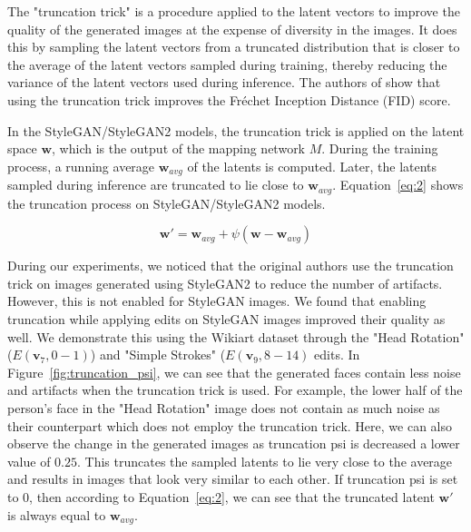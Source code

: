 The "truncation trick" is a procedure applied to the latent vectors to improve the quality of the generated images at the expense of diversity in the images. It does this by sampling the latent vectors from a truncated distribution that is closer to the average of the latent vectors sampled during training, thereby reducing the variance of the latent vectors used during inference. The authors of \cite{biggan} show that using the truncation trick improves the Fréchet Inception Distance (FID) score.

In the StyleGAN/StyleGAN2 models, the truncation trick is applied on the latent space $\textbf{w}$, which is the output of the mapping network $M$. During the training process, a running average $\textbf{w}_{avg}$ of the latents is computed. Later, the latents sampled during inference are truncated to lie close to $\textbf{w}_{avg}$. Equation~\ref{eq:2} shows the truncation process on StyleGAN/StyleGAN2 models.

\begin{equation}
    \textbf{w}' = \textbf{w}_{avg} + \psi (\textbf{w} - \textbf{w}_{avg})
    \label{eq:2}
\end{equation}

During our experiments, we noticed that the original authors use the truncation trick on images generated using StyleGAN2 to reduce the number of artifacts. However, this is not enabled for StyleGAN images. We found that enabling truncation while applying edits on StyleGAN images improved their quality as well. We demonstrate this using the Wikiart dataset through the "Head Rotation" ($E(\textbf{v}_{7}, 0-1)$) and "Simple Strokes" ($E(\textbf{v}_{9}, 8-14)$ edits. In Figure~\ref{fig:truncation_psi}, we can see that the generated faces contain less noise and artifacts when the truncation trick is used. For example, the lower half of the person's face in the "Head Rotation" image does not contain as much noise as their counterpart which does not employ the truncation trick. Here, we can also observe the change in the generated images as truncation psi is decreased a lower value of $0.25$. This truncates the sampled latents to lie very close to the average and results in images that look very similar to each other. If truncation psi is set to $0$, then according to Equation~\ref{eq:2}, we can see that the truncated latent $\textbf{w}'$ is always equal to $\textbf{w}_{avg}$.

